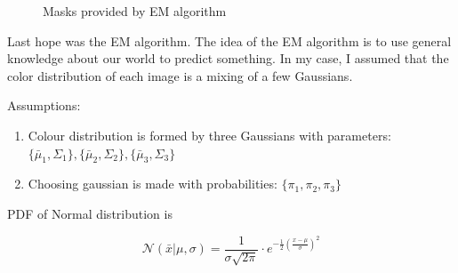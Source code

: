 \begin{figure}[h]
\begin{center}
    \end{center}
    \caption{Masks provided by EM algorithm}
\end{figure}


Last hope was the EM\cite{em1}\cite{em_algo_2} algorithm. The idea of the EM algorithm is to use 
general knowledge about our world to predict something. In my case, I assumed 
that the color distribution of each image is a mixing of a few Gaussians. 

Assumptions:
\begin{enumerate}
    \item Colour distribution is formed by three Gaussians with parameters: 
    \\
    $\{\bar\mu_1, \Sigma_1\}, \{\bar\mu_2, \Sigma_2\}, \{\bar\mu_3, \Sigma_3\}$
    \item Choosing gaussian is made with probabilities: $\{\pi_1, \pi_2, \pi_3\}$
\end{enumerate}

PDF of Normal distribution is
    
    \[\mathcal{N}(\bar x | \mu, \sigma) = \displaystyle \frac{1}{\sigma \sqrt{2\pi}} \cdot e^{\displaystyle-\frac{1}{2}{(\frac{x-\mu}{\sigma})}^2}\]


